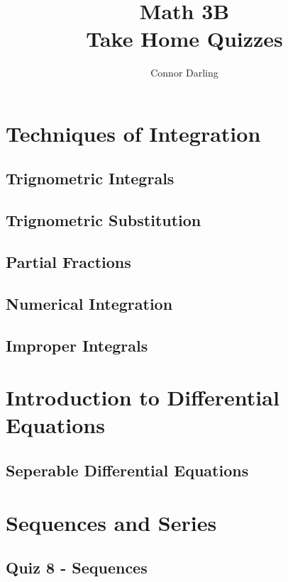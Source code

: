 \documentclass{report}
\title{\Huge{Math 3B}\\Take Home Quizzes}
\author{\huge{Connor Darling}}
\date{}
\begin{document}
\maketitle
\newpage%
\tableofcontents
\pagebreak

\setcounter{chapter}{2}
\chapter{Techniques of Integration}
\setcounter{section}{1}
\section{Trignometric Integrals}
\section{Trignometric Substitution}
\section{Partial Fractions}
\setcounter{section}{5}
\section{Numerical Integration}
\section{Improper Integrals}

\chapter{Introduction to Differential Equations}
\setcounter{section}{2}
\section{Seperable Differential Equations}

\chapter{Sequences and Series}


\section{Quiz 8 - Sequences}
\newpage

\end{document}
